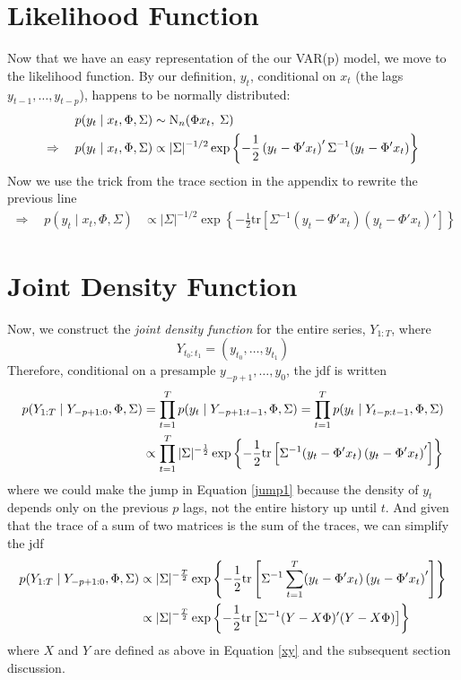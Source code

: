 \documentclass[a4paper,12pt]{scrartcl}
\begin{document}
\section{Likelihood Function}

Now that we have an easy representation of the our
VAR(p) model, we move to the likelihood function.
By our definition,  $y_t$, conditional on $x_t$ 
(the lags $y_{t-1}, \ldots, y_{t-p}$), happens
to be normally distributed:
\begin{align}
    p(y_t \; | \; x_t, \Phi, \Sigma) &\sim
	\text{N}_{n}(\Phi x_t, \; \Sigma) \notag \\
    \Rightarrow \quad p(y_t \; | \; x_t, \Phi, \Sigma) 
	&\propto |\Sigma|^{-1/2} 
	\exp\left\{ -\frac{1}{2} \left(y_t - \Phi' x_t
	\right)' \Sigma^{-1} (y_t - \Phi' x_t)\right\}
\end{align}
Now we use the trick from the trace section in the 
appendix to rewrite the previous line
\begin{align}
    \Rightarrow \quad p(y_t \; | \; x_t, \Phi, \Sigma) 
	&\propto |\Sigma|^{-1/2} 
	\exp\left\{ -\frac{1}{2} \text{tr} \left[ \Sigma^{-1}  
	(y_t - \Phi' x_t)\left(y_t - \Phi' x_t\right)'
	\right]\right\}
\end{align}



\newpage
\section{Joint Density Function}

Now, we construct the \emph{joint density function} for
the entire series, $Y_{1:T}$, where 
    \[ Y_{t_0:t_1} = (y_{t_0}, \ldots, y_{t_1}) \]
Therefore, conditional on a presample $y_{-p+1}, \ldots, y_0$, 
the jdf is written
\begin{align}
    p(Y_{1:T} \; | \; Y_{-p+1:0}, \Phi, \Sigma)
	&= \prod_{t=1}^T p(y_t \; | \; Y_{-p+1:t-1}, \Phi, 
	\Sigma) 
	= \prod_{t=1}^T p(y_t \; | \; Y_{t-p:t-1}, \Phi, \Sigma) 
	\label{jump1} \\
    &\propto \prod_{t=1}^T
	|\Sigma|^{-\frac{1}{2}} 
	\exp\left\{ -\frac{1}{2} \text{tr} \left[ \Sigma^{-1}  
	(y_t - \Phi' x_t)\left(y_t - \Phi' x_t\right)'
	\right]\right\} \notag
\end{align}
where we could make the jump in Equation \ref{jump1}  
because the density of $y_t$ depends only on the previous
$p$ lags, not the entire history up until $t$. 
And given that the trace of a sum of two matrices is the
sum of the traces, we can simplify the jdf
\begin{align}
    p(Y_{1:T} \; | \; Y_{-p+1:0}, \Phi, \Sigma)
	&\propto 
	|\Sigma|^{-\frac{T}{2}} 
	\exp\left\{ -\frac{1}{2} \text{tr} \left[ \Sigma^{-1}  
	\sum^T_{t=1} (y_t - \Phi' x_t)\left(y_t -\Phi' x_t\right)'
	\right]\right\} \notag \\
    &\propto 
	|\Sigma|^{-\frac{T}{2}} 
	\exp\left\{ -\frac{1}{2} \text{tr} \left[ \Sigma^{-1}  
	(Y - X\Phi)'(Y-X\Phi)\right]\right\} \label{jdf}
\end{align}
where $X$ and $Y$ are defined as above in Equation \ref{xy}
and the subsequent section discussion.
\end{document}
